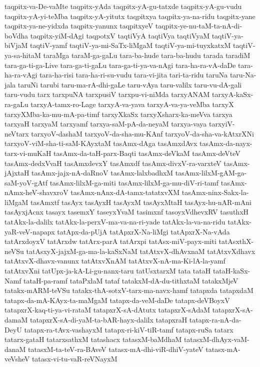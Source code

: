 {taqpitx-va-De-vaMte
taqpitx-yAda
taqpitx-yA-gu-tatxde
taqpitx-yA-gu-vudu
taqpitx-yA-yi-teMba
taqpitx-yA-yitutx
taqpitxya
taqpitx-ya-na-ridu
taqpitx-yane
taqpitx-ya-ne-yidxda
taqpitx-yanunx
taqpitxyeV
taqpitx-ye-nu-taM-ta-nA-di-boVdha
taqpitx-yiM-dAgi
taqpotxV
taqtiVyA
taqtiVya
taqtiVyaM
taqtiV-ya-biVjaM
taqtiV-yamf
taqtiV-ya-mi-SaTx-liMgaM
taqtiV-ya-mi-tuyxkatxM
taqtiV-ya-sa-hitaM
taraMga
taraM-ga-gaLu
tara-ba-hude
tara-ba-hudu
tarada
taradiM
tara-ga-ti-ga-Live
tara-ga-ti-gaLu
tara-ga-ti-ya-va-nAgi
tara-ha-ra-vA-daDe
tara-ha-ra-vAgi
tara-ha-risi
tara-ha-ri-su-vudu
tara-vi-jita
tari-ta-ridu
taruNa
taru-Na-jala
taruNi
tarubi
taru-ma-rA-dhi-gaLe
taru-vAya
taru-valilx
taru-vu-dA-gali
taru-vudu
tarx
tarxpuNA
tarxpusiV
tarxpu-vi-niMda
tarxyANAM
tarxyA-kaSx-ra-gaLu
tarxyA-tamx-ro-Lage
tarxyA-va-yava
tarxyA-va-ya-veMba
tarxyX
tarxyXMba-ka-mu-mA-pa-timf
tarxyXkaSx
tarxyXsharx-ka-meVva
tarxya
tarxyaH
tarxyaM
tarxyamf
tarxya-saM-pA-da-neyaM
tarxya-vaya
tarxyiV-neVtarx
tarxyoV-dashaM
tarxyoV-da-sha-mu-KAnf
tarxyoV-da-sha-va-kAtxrXNi
tarxyoV-viM-sha-ti-saM-KAyxtaM
tasAmx-dAga
tasAmxdAvx
tasAmx-da-nayx-tarx-vi-muKaH
tasAmx-da-taH-parx-Baqti
tasAmx-deVkaM
tasAmx-deVteV
tasAmx-dedxVvaH
tasAmxdevxY
tasAmxdf
tasAmx-divxV-ra-varxteV
tasAmx-jAjxtaH
tasAmx-jajx-nA-daRnoV
tasAmx-lalxbadhxM
tasAmx-lilxM-gAM-ga-saM-yoV-gAtf
tasAmx-lilxM-ga-miti
tasAmx-lilxM-ga-mu-diV-ri-tamf
tasAmx-nAmx-heV-shavxroV
tasAmx-nAnx-dA-tamx-tatatxvXM
tasAmx-ninx-Sakx-la-liMgaM
tasAmxtf
tasAyx
tasAyxH
tasAyxM
tasAyxMtaH
tasAyx-hu-nAR-mAni
tasAyxjAcnx
tasayx
tasemxY
taseyxYvaM
tasimxnf
tasoyxVdhevxRV
tasuthxH
tatAkx-la-dalilx
tatAkx-la-perxV-ma-va-na-ri-yade
tatAkx-la-va-na-ridu
tatAkx-yaR-veV-napapx
tatApx-da-pUjA
tatApxrX-Na-liMgi
tatApxrX-Na-vAda
tatArxdoyxV
tatArxdw
tatArx-parA
tatArxpi
tatAsx-miV-payx-miti
tatAsxthX-neVSu
tatAsxyX-jajxM-ga-ma-la-kaSxNaM
tatAtxvX-dhAvxnaM
tatAtxvXdhavx
tatAtxvX-dhavx-vanunx
tatAtxvXnAM
tatAtxvX-nA-ma-Ki-lA-la-yamf
tatAtxvXni
tatUpx-ja-kA-Li-gu-nanx-taru
tatUsxtarxM
tata
tataH
tataH-kaSx-Namf
tataH-pa-ramf
tataPxlaM
tataf
tatakxM-dA-du-tithxtaM
tatakxMjeV
tatakx-mARM-teVSu
tatakx-thA-sotxV-tarx-ma-navx-hamf
tatapxda
tatapxdaM
tatapx-da-mA-KAyx-ta-maMgaM
tatapx-da-veM-daDe
tatapx-deVBoyxV
tatapxrX-kaq-ti-ya-vi-rataM
tatapxrX-sA-dAtutx
tatapxrX-sAdaM
tatapxrX-sA-damaM
tatapxrX-sA-di-yaM-ta-bAR-hayx-dalilx
tatapxraH
tatapx-ra-nA-da-DeyU
tatapx-ra-tAvx-vashayxM
tatapx-ri-kiV-tiR-tamf
tatapx-ruSa
tatarx
tatarx-gataH
tatarxsathxM
tatashacx
tatasxM-baMdhaM
tatasxM-dhAyx-vaM-danaM
tatasxM-ta-teV-ra-BAveV
tatasx-mA-dhi-viR-dhiV-yateV
tatasx-mA-veVsheV
tatasx-vi-tu-vaR-reVNayxM
}
